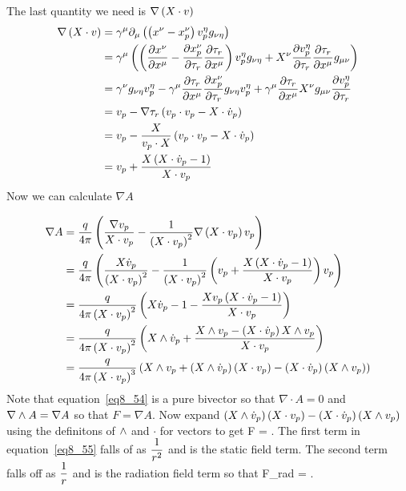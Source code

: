 The last quantity we need is $\nabla\left ( {X\cdot v} \right )$
\begin{align}
	\nabla\left ( {X\cdot v} \right ) &= \gamma^{\mu}\partial_{\mu}\left ( {\left ( {x^{\nu}-x_{p}^{\nu}} \right ) v_{p}^{\eta}g_{\nu\eta}} \right ) \nonumber \\
	                       &= \gamma^{\mu}\left ( {\left ( {\displaystyle\frac{\partial{x^{\nu}}}{\partial{x^{\mu}}}-\displaystyle\frac{\partial{x_{p}^{\nu}}}{\partial{\tau_{r}}}\displaystyle\frac{\partial{\tau_{r}}}{\partial{x^{\mu}}}} \right ) v_{p}^{\eta}g_{\nu\eta}
	                          +X^{\nu}\displaystyle\frac{\partial{v_{p}^{\eta}}}{\partial{\tau_{r}}}\displaystyle\frac{\partial{\tau_{r}}}{\partial{x^{\mu}}}g_{\mu\nu}} \right ) \nonumber \\
	                       &= \gamma^{\nu}g_{\nu\eta}v_{p}^{\eta}-\gamma^{\mu}\displaystyle\frac{\partial{\tau_{r}}}{\partial{x^{\mu}}}\displaystyle\frac{\partial{x_{p}^{\nu}}}{\partial{\tau_{r}}}g_{\nu\eta}v_{p}^{\eta}
	                          +\gamma^{\mu}\displaystyle\frac{\partial{\tau_{r}}}{\partial{x^{\mu}}}X^{\nu}g_{\mu\nu}\displaystyle\frac{\partial{v_{p}^{\eta}}}{\partial{\tau_{r}}} \nonumber \\
	                       &= v_{p}-\nabla\tau_{r}\left ( {v_{p}\cdot v_{p} - X\cdot\dot{v}_{p}} \right ) \nonumber \\
	                       &= v_{p}-\displaystyle\frac{X}{v_{p}\cdot X}\left ( {v_{p}\cdot v_{p} - X\cdot\dot{v}_{p}} \right ) \nonumber \\
	                       &= v_{p}+\displaystyle\frac{X\left ( {X\cdot\dot{v}_{p}-1} \right )}{X\cdot v_{p}} 
\end{align}
Now we can calculate $\nabla A$

\begin{align}\label{eq8_54}
	\nabla A &= \displaystyle\frac{q}{4\pi}\left ( {\displaystyle\frac{\nabla v_{p}}{X\cdot v_{p}}-\displaystyle\frac{1}{\left ( {X\cdot v_{p}} \right )^{2}}\nabla\left ( {X\cdot v_{p}} \right ) v_{p}} \right ) \nonumber \\
	         &= \displaystyle\frac{q}{4\pi}\left ( {\displaystyle\frac{X\dot{v}_{p}}{\left ( {X\cdot v_{p}} \right )^{2}}-\displaystyle\frac{1}{\left ( {X\cdot v_{p}} \right )^{2}}\left ( {v_{p}+\displaystyle\frac{X\left ( {X\cdot\dot{v}_{p}-1} \right )}{X\cdot v_{p}}} \right ) v_{p}} \right ) \nonumber \\
	         &= \displaystyle\frac{q}{4\pi\left ( {X\cdot v_{p}} \right )^{2}}\left ( {X\dot{v}_{p}-1-\displaystyle\frac{Xv_{p}\left ( {X\cdot\dot{v}_{p}-1} \right )}{X\cdot v_{p}}} \right ) \nonumber \\
	         &= \displaystyle\frac{q}{4\pi\left ( {X\cdot v_{p}} \right )^{2}}\left ( {X\wedge\dot{v}_{p}+\displaystyle\frac{X\wedge v_{p}-\left ( {X\cdot\dot{v}_{p}} \right ) X\wedge v_{p}}{X\cdot v_{p}}} \right ) \nonumber \\
	         &= \displaystyle\frac{q}{4\pi\left ( {X\cdot v_{p}} \right )^{3}}\left ( {X\wedge v_{p}+ \left ( {X\wedge\dot{v}_{p}} \right )\left ( {X\cdot v_{p}} \right )-\left ( {X\cdot\dot{v}_{p}} \right )\left ( {X\wedge v_{p}} \right )} \right )
\end{align}
Note that equation~\ref{eq8_54} is a pure bivector so that $\nabla\cdot A = 0$ and $\nabla\wedge A = \nabla A$ so that $F = \nabla A$.  Now expand
$\left ( {X\wedge\dot{v}_{p}} \right )\left ( {X\cdot v_{p}} \right )-\left ( {X\cdot\dot{v}_{p}} \right )\left ( {X\wedge v_{p}} \right )$ using the definitons of $\wedge$ and $\cdot$ for vectors to get
\be\label{eq8_55}
	F = .
\ee
The first term in equation~\ref{eq8_55} falls of as $\displaystyle\frac{1}{r^{2}}$ and is the static field term.  The second term falls off as $\displaystyle\frac{1}{r}$ and is the 
radiation field term so that
\be
	F_{\mbox{rad}} = .
\ee
